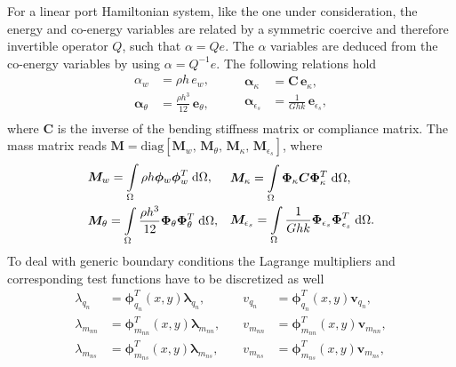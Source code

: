 \documentclass{ifacconf}
\begin{document}
For a linear port Hamiltonian system, like the one under consideration, the energy and co-energy variables are related by a symmetric coercive and therefore invertible operator $Q$, such that $\alpha = Q e$. The $\alpha$ variables are deduced from the co-energy variables by using $\alpha = Q^{-1} e$. The following relations hold
\begin{equation}
\begin{aligned}
\alpha_w &= \rho h \, e_w, \\
\bm{\alpha}_\theta &= \frac{\rho h^3}{12} \, \bm{e}_\theta, \\
\end{aligned} \qquad 
\begin{aligned}
\bm{\alpha}_\kappa &= \bm{C} \, \bm{e}_\kappa, \\ 
\bm{\alpha}_{\epsilon_s} &= \frac{1}{G h k} \, \bm{e}_{\epsilon_s}, \\ 
\end{aligned}
\end{equation}
where $\bm{C}$ is the inverse of the bending stiffness matrix or compliance matrix. The mass matrix reads $\bm{M} = \text{diag}[\bm{M}_w,\, \bm{M}_\theta,\, \bm{M}_\kappa,\, \bm{M}_{\epsilon_s}]$, where
\begin{equation}
\begin{aligned}
&\bm{M}_w = \int_{\Omega} \rho h \bm{\phi}_w \bm{\phi}_w^T \d\Omega, \\
&\bm{M}_\theta = \int_{\Omega} \frac{\rho h^3}{12} \bm{\Phi}_\theta \bm{\Phi}_\theta^T \d\Omega, \\
\end{aligned} \quad
\begin{aligned}
&\bm{M}_\kappa = \int_{\Omega} \bm{\Phi}_\kappa \bm{C} \bm{\Phi}_\kappa^T \d\Omega, \\
&\bm{M}_{\epsilon_s} = \int_{\Omega} \frac{1}{G h k} \bm{\Phi}_{\epsilon_s} \bm{\Phi}_{\epsilon_s}^T \d\Omega. \\
\end{aligned}
\end{equation}
To deal with generic boundary conditions the Lagrange multipliers and corresponding test functions  have to be discretized as well
\begin{equation}
\begin{aligned}
\lambda_{q_n} &= \bm{\phi}^T_{q_n}(x,y) \bm{\lambda}_{q_n},\\
\lambda_{m_{nn}} &= \bm{\phi}^T_{m_{nn}}(x,y) \bm{\lambda}_{m_{nn}},\\
\lambda_{m_{ns}} &= \bm{\phi}^T_{m_{ns}}(x,y) \bm{\lambda}_{m_{ns}},\\
\end{aligned} \quad 
\begin{aligned}
v_{q_n} &= \bm{\phi}^T_{q_n}(x,y) \bm{v}_{q_n},\\
v_{m_{nn}} &= \bm{\phi}^T_{m_{nn}}(x,y) \bm{v}_{m_{nn}},\\
v_{m_{ns}} &= \bm{\phi}^T_{m_{ns}}(x,y) \bm{v}_{m_{ns}},\\
\end{aligned}
\end{equation}
\end{document}

